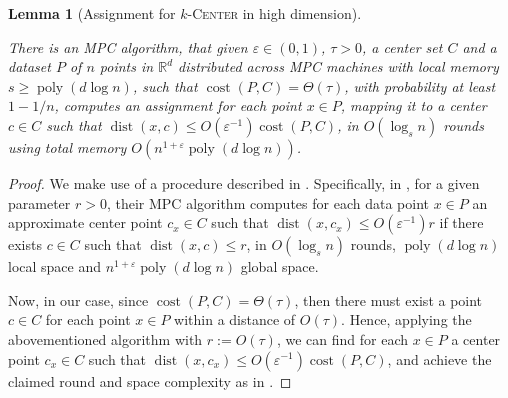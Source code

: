 \documentclass[11pt,letterpaper]{article}
\theoremstyle{plain}
\newtheorem{lemma}[theorem]{Lemma}
\theoremstyle{definition}
\theoremstyle{remark}
\newcommand{\ProblemName}[1]{\textsc{#1}}
\newcommand{\kCenter}{$k$-\ProblemName{Center}\xspace}
\DeclareMathOperator{\poly}{poly}
\DeclareMathOperator{\cost}{cost}
\DeclareMathOperator{\dist}{dist}
\renewcommand{\epsilon}{\ensuremath{\varepsilon}}
\let\epsilon\varepsilon
\begin{document}
\begin{lemma}[Assignment for \kCenter in high dimension]
    \label{lemma:assignment_high_dim}




    There is an MPC algorithm, that given $\varepsilon\in (0, 1)$, $\tau > 0$,
    a center set $C$ and a dataset $P$ of $n$ points in $\mathbb{R}^{d}$ distributed across MPC machines
    with local memory $s\geq \poly(d\log n)$, such that $\cost(P, C) = \Theta(\tau)$, with probability at least $1-1/n$, computes an assignment for each point $x\in P$, mapping it to a center $c\in C$ such that $\dist(x, c)\leq O(\varepsilon^{-1})\cost(P, C)$, in $O(\log_{s}n)$ rounds using total memory $O(n^{1+\varepsilon}\poly(d\log n))$. 
\end{lemma}
\begin{proof}
We make use of a procedure described in \cite[Section 3.1]{CGJKV24}.  
    Specifically, in \cite[Section 3.1]{CGJKV24}, for a given parameter $r>0$, their MPC algorithm computes
    for each data point $x\in P$ an approximate center point $c_x \in C$
    such that $\dist(x, c_x) \leq O(\epsilon^{-1}) r$ if there exists $c \in C$ such that $\dist(x, c) \leq r$,
    in $O(\log_s n)$ rounds, $\poly(d\log n)$ local space and $n^{1 + \epsilon} \poly(d \log n)$ global space.
    
    Now, in our case, since $\cost(P, C) = \Theta(\tau)$, then there must exist a point $c \in C$ for each point $x\in P$  within a distance of $O(\tau)$. 
    Hence, applying the abovementioned algorithm with $r:= O(\tau)$, we can find for each $x\in P$ a center point $c_x\in C$ such that $\dist(x, c_x)\leq O(\varepsilon^{-1})\cost(P, C)$,
    and achieve the claimed round and space complexity as in .
\end{proof}


























     







    
\end{document}
